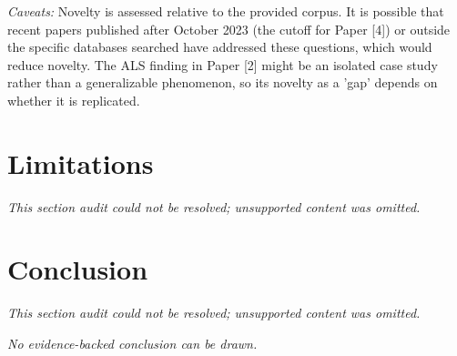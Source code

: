 \documentclass[11pt]{article}
\begin{document}
\textit{Caveats:} Novelty is assessed relative to the provided corpus. It is possible that recent papers published after October 2023 (the cutoff for Paper [4]) or outside the specific databases searched have addressed these questions, which would reduce novelty. The ALS finding in Paper [2] might be an isolated case study rather than a generalizable phenomenon, so its novelty as a 'gap' depends on whether it is replicated.

\section{Limitations}
\textit{This section audit could not be resolved; unsupported content was omitted.}

\section{Conclusion}
\textit{This section audit could not be resolved; unsupported content was omitted.}

\textit{No evidence-backed conclusion can be drawn.}
\end{document}
